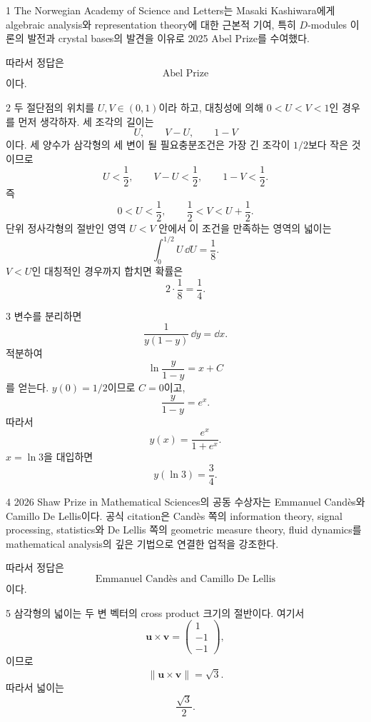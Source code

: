 \documentclass[11pt,oneside]{article}
\begin{document}

\begin{problemsolution}{1}
The Norwegian Academy of Science and Letters는 Masaki Kashiwara에게 algebraic analysis와 representation theory에 대한 근본적 기여, 특히 $D$-modules 이론의 발전과 crystal bases의 발견을 이유로 2025 Abel Prize를 수여했다.

따라서 정답은
\[
    \boxed{\text{Abel Prize}}
\]
이다.
\end{problemsolution}

\begin{problemsolution}{2}
두 절단점의 위치를 $U,V\in(0,1)$이라 하고, 대칭성에 의해 $0<U<V<1$인 경우를 먼저 생각하자. 세 조각의 길이는
\[
    U,
    \qquad
    V-U,
    \qquad
    1-V
\]
이다. 세 양수가 삼각형의 세 변이 될 필요충분조건은 가장 긴 조각이 $1/2$보다 작은 것이므로
\[
    U<\frac12,
    \qquad
    V-U<\frac12,
    \qquad
    1-V<\frac12.
\]
즉
\[
    0<U<\frac12,
    \qquad
    \frac12<V<U+\frac12.
\]
단위 정사각형의 절반인 영역 $U<V$ 안에서 이 조건을 만족하는 영역의 넓이는
\[
    \int_0^{1/2}U\,\dd U
    =\frac18.
\]
$V<U$인 대칭적인 경우까지 합치면 확률은
\[
    2\cdot\frac18
    =\boxed{\frac14}.
\]
\end{problemsolution}

\begin{problemsolution}{3}
변수를 분리하면
\[
    \frac{1}{y(1-y)}\,\dd y
    =\dd x.
\]
적분하여
\[
    \ln\frac{y}{1-y}=x+C
\]
를 얻는다. $y(0)=1/2$이므로 $C=0$이고,
\[
    \frac{y}{1-y}=e^x.
\]
따라서
\[
    y(x)=\frac{e^x}{1+e^x}.
\]
$x=\ln3$을 대입하면
\[
    \boxed{y(\ln3)=\frac34}.
\]
\end{problemsolution}

\begin{problemsolution}{4}
2026 Shaw Prize in Mathematical Sciences의 공동 수상자는 Emmanuel Cand\`es와 Camillo De Lellis이다. 공식 citation은 Cand\`es 쪽의 information theory, signal processing, statistics와 De Lellis 쪽의 geometric measure theory, fluid dynamics를 mathematical analysis의 깊은 기법으로 연결한 업적을 강조한다.

따라서 정답은
\[
    \boxed{\text{Emmanuel Cand\`es and Camillo De Lellis}}
\]
이다.
\end{problemsolution}

\begin{problemsolution}{5}
삼각형의 넓이는 두 변 벡터의 cross product 크기의 절반이다. 여기서
\[
    \mathbf{u}\times\mathbf{v}
    =
    \begin{pmatrix}
        1\\-1\\-1
    \end{pmatrix},
\]
이므로
\[
    \|\mathbf{u}\times\mathbf{v}\|
    =\sqrt3.
\]
따라서 넓이는
\[
    \boxed{\frac{\sqrt3}{2}}.
\]
\end{problemsolution}
\end{document}
